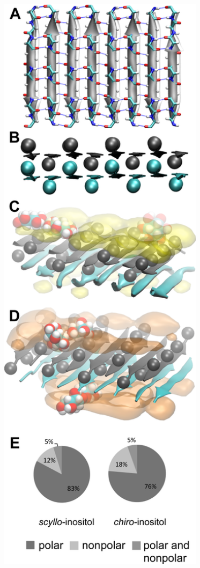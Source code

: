 \begin{figure}[ht]
  \centering
  \includegraphics[width=4in]{figures/results1/GA4_paper_figures_submitted-6}

\end{figure}
